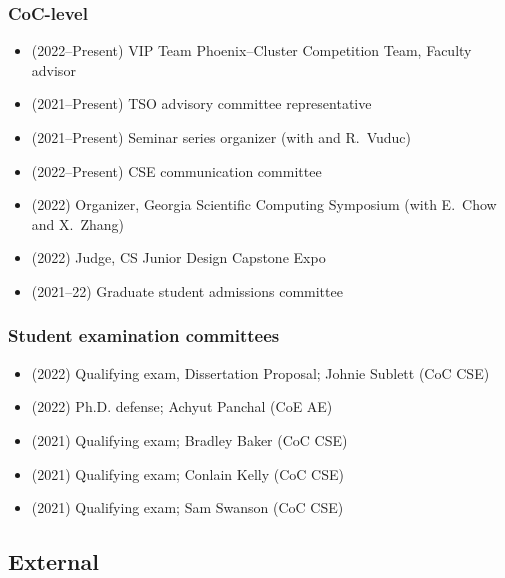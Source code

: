 \subsubsection{CoC-level}

\begin{itemize}
    \item (2022--Present) VIP Team Phoenix--Cluster Competition Team, Faculty advisor
    \item (2021--Present) TSO advisory committee representative
    \item (2021--Present) Seminar series organizer (with \Florian and R.\ Vuduc)
    \item (2022--Present) CSE communication committee
    \item (2022) Organizer, Georgia Scientific Computing Symposium (with E.\ Chow and X.\ Zhang)
    \item (2022) Judge, CS Junior Design Capstone Expo
    \item (2021--22) Graduate student admissions committee
\end{itemize}

\subsubsection{Student examination committees}

\begin{itemize}
    \item (2022) Qualifying exam, Dissertation Proposal; Johnie Sublett (CoC CSE)
    \item (2022) Ph.D. defense; Achyut Panchal (CoE AE)
    \item (2021) Qualifying exam; Bradley Baker (CoC CSE)
    \item (2021) Qualifying exam; Conlain Kelly (CoC CSE)
    \item (2021) Qualifying exam; Sam Swanson (CoC CSE)
\end{itemize}

\subsection{External}

